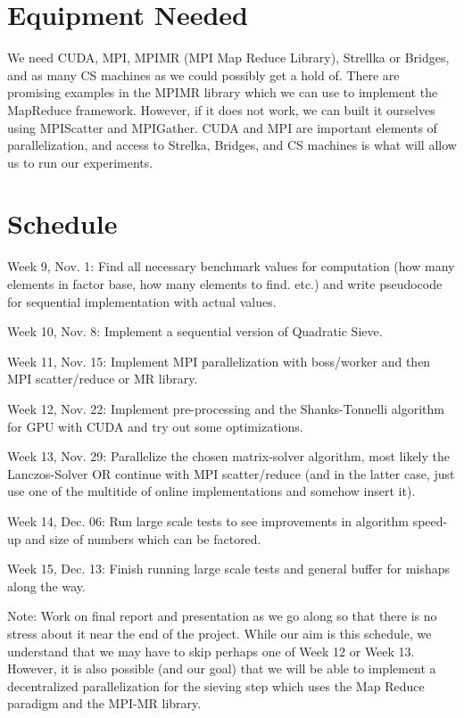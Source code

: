 \documentclass[11pt,twocolumn]{article}
\newenvironment{my_enumerate}{
  \begin{enumerate}
    \setlength{\itemsep}{1pt}
      \setlength{\parskip}{0pt}
\setlength{\parsep}{0pt}}{\end{enumerate}
}
\begin{document}
\section {Equipment Needed}\label{equip}
We need CUDA, MPI, MPIMR (MPI Map Reduce Library), Strellka or Bridges, and as many CS machines as we could possibly get a hold of. There are promising examples in the MPIMR library which we can use to implement the MapReduce framework. However, if it does not work, we can built it ourselves using MPIScatter and MPIGather. CUDA and MPI are important elements of parallelization, and access to Strelka, Bridges, and CS machines is what will allow us to run our experiments.

\section {Schedule}\label{sched}
\begin{my_enumerate}
  \item Week 9, Nov. 1: Find all necessary benchmark values for computation (how many elements in factor base, how many elements to find. etc.) and write pseudocode for sequential implementation with actual values.
  \item Week 10, Nov. 8: Implement a sequential version of Quadratic Sieve.
  \item Week 11, Nov. 15: Implement MPI parallelization with boss/worker and then MPI scatter/reduce or MR library.
  \item Week 12, Nov. 22: Implement pre-processing and the Shanks-Tonnelli algorithm for GPU with CUDA and try out some optimizations.
  \item Week 13, Nov. 29: Parallelize the chosen matrix-solver algorithm, most likely the Lanczos-Solver OR continue with MPI scatter/reduce (and in the latter case, just use one of the multitide of online implementations and somehow insert it).
  \item Week 14, Dec. 06: Run large scale tests to see improvements in algorithm speed-up and size of numbers which can be factored.
  \item Week 15, Dec. 13: Finish running large scale tests and general buffer for mishaps along the way.
\end{my_enumerate}

Note: Work on final report and presentation as we go along so that there is no stress about it near the end of the project. While our aim is this schedule, we understand that we may have to skip perhaps one of Week 12 or Week 13. However, it is also possible (and our goal) that we will be able to implement a decentralized parallelization for the sieving step which uses the Map Reduce paradigm and the MPI-MR library.
\end{document}
